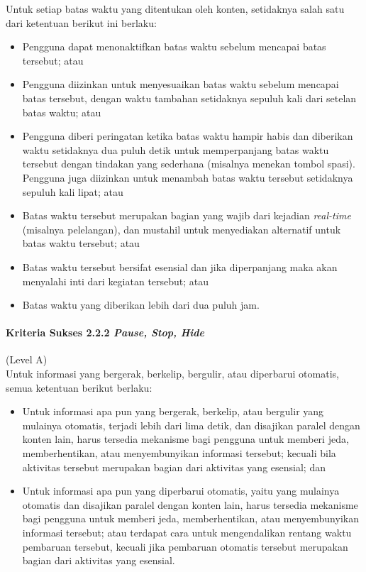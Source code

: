 Untuk setiap batas waktu yang ditentukan oleh konten, setidaknya salah satu dari ketentuan berikut ini berlaku:
\begin{itemize}
	\item Pengguna dapat menonaktifkan batas waktu sebelum mencapai batas tersebut; atau
	\item Pengguna diizinkan untuk menyesuaikan batas waktu sebelum mencapai batas tersebut, dengan waktu tambahan setidaknya sepuluh kali dari setelan batas waktu; atau
	\item Pengguna diberi peringatan ketika batas waktu hampir habis dan diberikan waktu setidaknya dua puluh detik untuk memperpanjang batas waktu tersebut dengan tindakan yang sederhana (misalnya menekan tombol spasi). Pengguna juga diizinkan untuk menambah batas waktu tersebut setidaknya sepuluh kali lipat; atau
	\item Batas waktu tersebut merupakan bagian yang wajib dari kejadian \textit{real-time} (misalnya pelelangan), dan mustahil untuk menyediakan alternatif untuk batas waktu tersebut; atau
	\item Batas waktu tersebut bersifat esensial dan jika diperpanjang maka akan menyalahi inti dari kegiatan tersebut; atau
	\item Batas waktu yang diberikan lebih dari dua puluh jam.
\end{itemize}

\paragraph{Kriteria Sukses 2.2.2 \textit{Pause, Stop, Hide}}
\label{sec:kriteria_sukses_2.2.2}
(Level A)\\

Untuk informasi yang bergerak, berkelip, bergulir, atau diperbarui otomatis, semua ketentuan berikut berlaku:
\begin{itemize}
	\item Untuk informasi apa pun yang bergerak, berkelip, atau bergulir yang mulainya otomatis, terjadi lebih dari lima detik, dan disajikan paralel dengan konten lain, harus tersedia mekanisme bagi pengguna untuk memberi jeda, memberhentikan, atau menyembunyikan informasi tersebut; kecuali bila aktivitas tersebut merupakan bagian dari aktivitas yang esensial; dan
	\item Untuk informasi apa pun yang diperbarui otomatis, yaitu yang mulainya otomatis dan disajikan paralel dengan konten lain, harus tersedia mekanisme bagi pengguna untuk memberi jeda, memberhentikan, atau menyembunyikan informasi tersebut; atau terdapat cara untuk mengendalikan rentang waktu pembaruan tersebut, kecuali jika pembaruan otomatis tersebut merupakan bagian dari aktivitas yang esensial.
\end{itemize}


